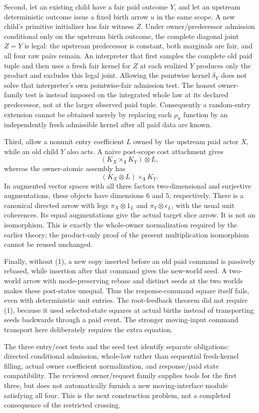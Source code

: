 \documentclass[11pt]{article}\usepackage{amsmath,amssymb,amsthm,geometry}\geometry{margin=1in}
\begin{document}
Second, let an existing child have a fair paid outcome $Y$, and let an upstream deterministic outcome issue a fixed birth arrow $u$ in the same scope. A new child's primitive initializer has fair witness $Z$. Under owner/predecessor admission conditional only on the upstream birth outcome, the complete diagonal joint $Z=Y$ is legal: the upstream predecessor is constant, both marginals are fair, and all four raw pairs remain. An interpreter that first samples the complete old paid tuple and then uses a fresh fair kernel for $Z$ at each realized $Y$ produces only the product and excludes this legal joint. Allowing the pointwise kernel $\delta_Y$ does not solve that interpreter's own pointwise-fair admission test. The honest owner-family test is instead imposed on the integrated whole law at its declared predecessor, not at the larger observed paid tuple. Consequently a random-entry extension cannot be obtained merely by replacing each $\rho_u$ function by an independently fresh admissible kernel after all paid data are known.

Third, allow a nonunit entry coefficient $L$ owned by the upstream paid actor $X$, while an old child $Y$ also acts. A naive post-scope cost attachment gives
\[
 (K_X\mathbin{\times}_{\mathbf1}K_Y)\otimes L,
\]
whereas the owner-atomic assembly has
\[
 (K_X\otimes L)\mathbin{\times}_{\mathbf1}K_Y.
\]
In augmented vector spaces with all three factors two-dimensional and surjective augmentations, these objects have dimensions $6$ and $5$, respectively. There is a canonical directed arrow with legs $\pi_X\otimes1_L$ and $\pi_Y\otimes\epsilon_L$, with the usual unit coherences. Its equal augmentations give the actual target slice arrow. It is not an isomorphism. This is exactly the whole-owner normalization required by the earlier theory; the product-only proof of the present multiplication isomorphism cannot be reused unchanged.

Finally, without (1), a new copy inserted before an old paid command is passively rebased, while insertion after that command gives the new-world seed. A two-world arrow with mode-preserving rebase and distinct seeds at the two worlds makes these post-states unequal. Thus the response-command square itself fails, even with deterministic unit entries. The root-feedback theorem did not require (1), because it used selected-state squares at actual births instead of transporting seeds backwards through a paid event. The stronger moving-input command transport here deliberately requires the extra equation.

The three entry/cost tests and the seed test identify separate obligations: directed conditional admission, whole-law rather than sequential fresh-kernel filling, actual owner coefficient normalization, and response/paid state compatibility. The reviewed owner/request family supplies tools for the first three, but does not automatically furnish a new moving-interface module satisfying all four. This is the next construction problem, not a completed consequence of the restricted crossing.
\end{document}
